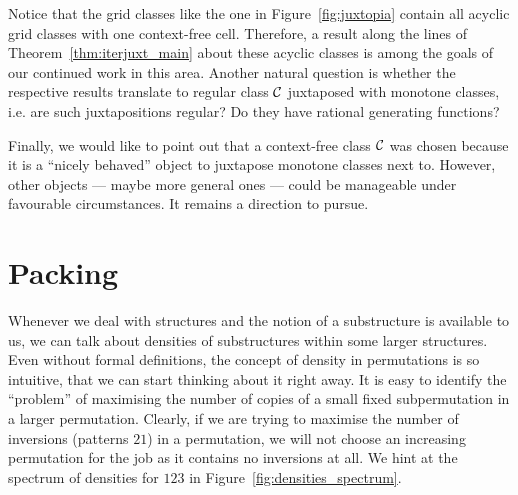 \documentclass[12pt, a4paper, twoside]{report}
\begin{document}
    

Notice that the grid classes like the one in Figure~\ref{fig:juxtopia} contain all acyclic grid classes with one context-free cell. Therefore, a result along the lines of Theorem~\ref{thm:iterjuxt_main} about these acyclic classes is among the goals of our continued work in this area. Another natural question is whether the respective results translate to regular class $\mathcal{C}$ juxtaposed with monotone classes, i.e. are such juxtapositions regular? Do they have rational generating functions?

Finally, we would like to point out that a context-free class $\mathcal{C}$ was chosen because it is a ``nicely behaved'' object to juxtapose monotone classes next to. However, other objects --- maybe more general ones --- could be manageable under favourable circumstances. It remains a direction to pursue. 





\part{Packing} %
\label{part:packing}

Whenever we deal with structures and the notion of a substructure is available to us, we can talk about densities of substructures within some larger structures. Even without formal definitions, the concept of density in permutations is so intuitive, that we can start thinking about it right away. It is easy to identify the ``problem'' of maximising the number of copies of a small fixed subpermutation in a larger permutation. Clearly, if we are trying to maximise the number of inversions (patterns $21$) in a permutation, we will not choose an increasing permutation for the job as it contains no inversions at all. We hint at the spectrum of densities for $123$ in Figure~\ref{fig:densities_spectrum}.
\end{document}
